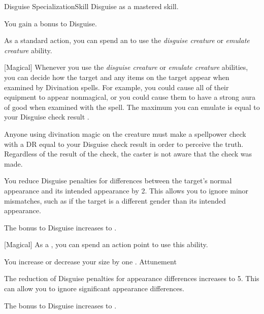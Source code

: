     \begin{feat}{Disguise Specialization}{Skill}
        \featpre Disguise as a mastered skill.
        \featben

         You gain a  bonus to Disguise.

         As a standard action, you can spend an  to use the \textit{disguise creature} or \textit{emulate creature} ability.

        [Magical] Whenever you use the \textit{disguise creature} or \textit{emulate creature} abilities, you can decide how the target and any items on the target appear when examined by Divination spells.
        For example, you could cause all of their equipment to appear nonmagical, or you could cause them to have a strong aura of good when examined with the  spell.
        The maximum  you can emulate is equal to your Disguise check result .

        Anyone using divination magic on the creature must make a spellpower check with a DR equal to your Disguise check result in order to perceive the truth.
        Regardless of the result of the check, the caster is not aware that the check was made.

         You reduce Disguise penalties for differences between the target's normal appearance and its intended appearance by 2.
        This allows you to ignore minor mismatches, such as if the target is a different gender than its intended appearance.

         The bonus to Disguise increases to .

        [Magical] As a , you can spend an action point to use this ability.
        \begin{ability}
            \begin{spelltargetinginfo}
            \end{spelltargetinginfo}
            \begin{spelleffects}
                \spelleffect You increase or decrease your size by one .
                \spelldur Attunement
            \end{spelleffects}
        \end{ability}

         The reduction of Disguise penalties for appearance differences increases to 5.
        This can allow you to ignore significant appearance differences.

         The bonus to Disguise increases to .
    \end{feat}

